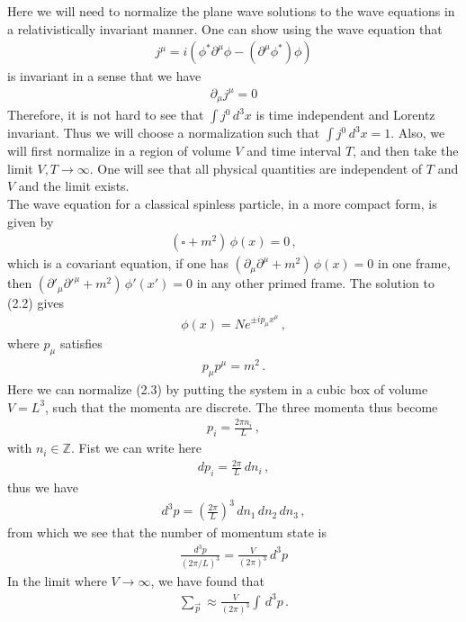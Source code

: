 \documentclass[11pt, onesided]{book}
\theoremstyle{break}
\theoremstyle{break}
\newcommand{\Z}{\mathbb{Z}}
\newcommand{\pd}{\partial}
\begin{document}
\newpage
Here we will need to normalize the plane wave solutions to the wave equations in a relativistically invariant manner. One can show using the wave equation that 
\begin{align*}
j^\mu = i \left( \phi^* \pd^\mu \phi - (\pd^\mu \phi^*) \phi\right)
\end{align*}
is invariant in a sense that we have
\begin{align*}
\pd_\mu j^\mu = 0
\end{align*}
Therefore, it is not hard to see that $\int j^0\, d^3x$ is time independent and Lorentz invariant. Thus we will choose a normalization such that $\int j^0 \, d^3 x = 1$. Also, we will first normalize in a region of volume $V$ and time interval $T$, and then take the limit $V,T \to \infty$. One will see that all physical quantities are independent of $T$ and $V$ and the limit exists.\\

The wave equation for a classical spinless particle, in a more compact form, is given by
\begin{align}
(\square + m^2)\, \phi(x) = 0\,,
\end{align} 
which is a covariant equation, if one has $(\pd_\mu \pd^\mu  + m^2) \, \phi(x) = 0$
in one frame, then $(\pd'_\mu \pd'^\mu  + m^2) \, \phi'(x') = 0$ in any other primed frame. The solution to (2.2) gives 
\begin{align}
\phi(x) = N e^{\pm i p_\mu x^\mu}\,,
\end{align}
where $p_\mu$ satisfies
\begin{align*}
p_\mu p^\mu = m^2\,.
\end{align*}
Here we can normalize (2.3) by putting the system in a cubic box of volume $V=L^3$, such that the momenta are discrete. The three momenta thus become
\begin{align*}
p_i = \frac{2\pi n_i}{L}\,,
\end{align*} 
with $n_i \in \Z$. Fist we can write here
\begin{align*}
dp_i = \frac{2\pi}{L} \, dn_i\,,
\end{align*}
thus we have
\begin{align*}
d^3p = \left( \frac{2\pi}{L}\right)^3 \,dn_1\, dn_2\, dn_3\,,
\end{align*}
from which we see that the number of momentum state is 
\begin{align*}
\frac{d^3p}{(2\pi /L)^3} = \frac{V}{(2\pi)^3}\, d^3p
\end{align*}
In the limit where $V \to \infty$, we have found that 
\begin{align*}
\sum_{\vec{p}}\approx \frac{V}{(2\pi)^3}\int \, d^3p\,.
\end{align*}
\end{document}
